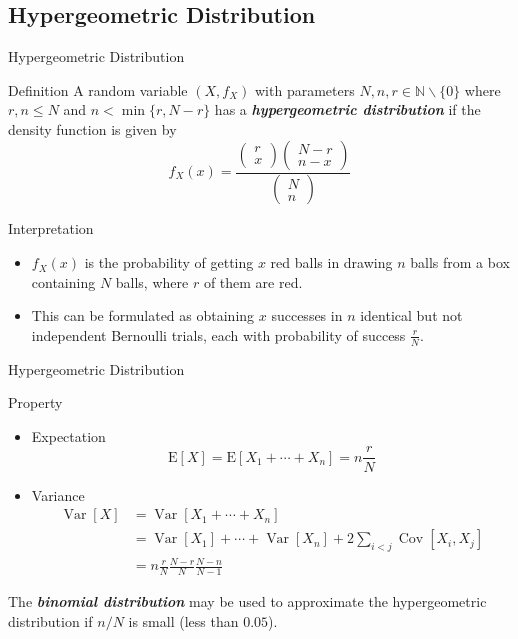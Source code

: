 \documentclass{beamer}
\newcommand{\bb}[1]{\textcolor{antiquefuchsia}{\textbf{\textit{#1}}}}
\begin{document}
\subsection{Hypergeometric Distribution}
\begin{frame}{Hypergeometric Distribution}
\begin{block}{Definition}
A random variable $\left(X, f_{X}\right)$ with parameters $N, n, r \in \mathbb{N} \backslash\{0\}$ where $r, n \leq N$ and $n<\min \{r, N-r\}$ has a \bb{hypergeometric distribution} if the density function is given by
$$
f_{X}(x)=\frac{\left(\begin{array}{l}
r \\
x
\end{array}\right)\left(\begin{array}{l}
N-r \\
n-x
\end{array}\right)}{\left(\begin{array}{l}
N \\
n
\end{array}\right)}
$$

\end{block}
\begin{block}{Interpretation}
\begin{itemize}
\item $f_{X}(x)$ is the probability of getting $x$ red balls in drawing $n$ balls from a box containing $N$ balls, where $r$ of them are red.
\item This can be formulated as obtaining $x$ successes in $n$ identical but not independent Bernoulli trials, each with probability of success $\frac{r}{N}$.
\end{itemize}
\end{block}
\end{frame}

\begin{frame}{Hypergeometric Distribution}
\begin{block}{Property}
\begin{itemize}
\item Expectation
$$
\mathrm{E}[X]=\mathrm{E}\left[X_{1}+\cdots+X_{n}\right]=n \frac{r}{N}
$$
\item Variance
$$
\begin{aligned}
\operatorname{Var}[X] &=\operatorname{Var}\left[X_{1}+\cdots+X_{n}\right] \\
&=\operatorname{Var}\left[X_{1}\right]+\cdots+\operatorname{Var}\left[X_{n}\right]+2 \sum_{i<j} \operatorname{Cov}\left[X_{i}, X_{j}\right] \\
&=n \frac{r}{N} \frac{N-r}{N} \frac{N-n}{N-1}
\end{aligned}
$$
\end{itemize}
The \bb{binomial distribution} may be used to approximate the hypergeometric distribution if $n / N$ is small (less than $0.05$).
\end{block}
\end{frame}
\end{document}
